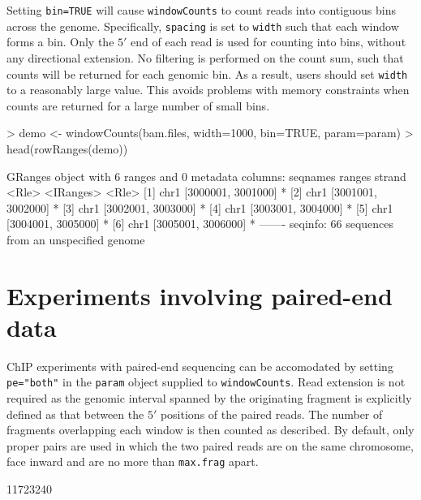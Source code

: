 \documentclass[12pt]{report}
\renewenvironment{Schunk}{\vspace{0pt}}{\vspace{0pt}}
\newcommand{\code}[1]{{\small\texttt{#1}}}
\begin{document}
Setting \code{bin=TRUE} will cause \code{windowCounts} to count reads into contiguous bins across the genome.
Specifically, \code{spacing} is set to \code{width} such that each window forms a bin.
Only the $5'$ end of each read is used for counting into bins, without any directional extension.
No filtering is performed on the count sum, such that counts will be returned for each genomic bin. 
As a result, users should set \code{width} to a reasonably large value.
This avoids problems with memory constraints when counts are returned for a large number of small bins.

\begin{Schunk}
\begin{Sinput}
> demo <- windowCounts(bam.files, width=1000, bin=TRUE, param=param)
> head(rowRanges(demo))
\end{Sinput}
\begin{Soutput}
GRanges object with 6 ranges and 0 metadata columns:
      seqnames             ranges strand
         <Rle>          <IRanges>  <Rle>
  [1]     chr1 [3000001, 3001000]      *
  [2]     chr1 [3001001, 3002000]      *
  [3]     chr1 [3002001, 3003000]      *
  [4]     chr1 [3003001, 3004000]      *
  [5]     chr1 [3004001, 3005000]      *
  [6]     chr1 [3005001, 3006000]      *
  -------
  seqinfo: 66 sequences from an unspecified genome
\end{Soutput}
\end{Schunk}

\section{Experiments involving paired-end data}
\label{data:pet}

ChIP experiments with paired-end sequencing can be accomodated by setting \code{pe="both"} in the \code{param} object supplied to \code{windowCounts}. 
Read extension is not required as the genomic interval spanned by the originating fragment is explicitly defined as that between the $5'$ positions of the paired reads.
The number of fragments overlapping each window is then counted as described. 
By default, only proper pairs are used in which the two paired reads are on the same chromosome, face inward and are no more than \code{max.frag} apart.

\begin{Schunk}
\begin{Soutput}
[1] 11723240
\end{Soutput}
\end{Schunk}
\end{document}
